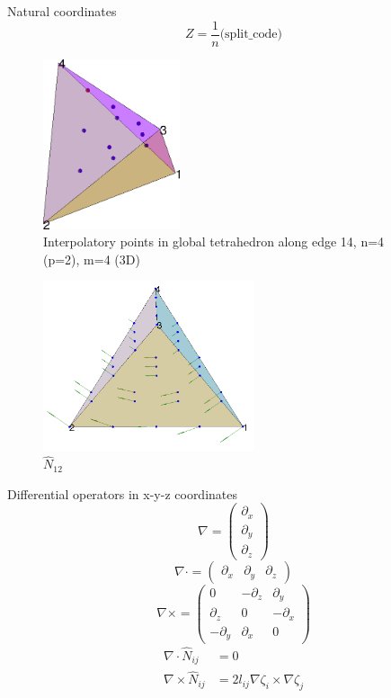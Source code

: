 \documentclass[a4paper,onecolumn]{article}
\begin{document}
Natural coordinates
$$
    Z = \frac{1}{n} \bigl(\textrm{split\_code}\bigr)
$$
\begin{figure}\begin{center}
    \includegraphics[height=5cm]{interppnt3D.png}
    \caption{Interpolatory points in global tetrahedron along edge 14, n=4 (p=2), m=4 (3D)}
\end{center}\end{figure}
\begin{figure}\begin{center}
    \includegraphics[height=5cm]{quiverbasis.png}
    \caption{$\hat{N}_{12}$}
\end{center}\end{figure}
Differential operators in x-y-z coordinates
$$
    \nabla = \begin{pmatrix}\partial_x \\ \partial_y \\\partial_z\end{pmatrix}
$$
$$
    \nabla\cdot = \begin{pmatrix}\partial_x& \partial_y &\partial_z\end{pmatrix}
$$
$$
    \nabla\times = \begin{pmatrix}
        0 & -\partial_z & \partial_y\\
        \partial_z & 0 & -\partial_x\\
        -\partial_y & \partial_x & 0
    \end{pmatrix}
$$
\begin{equation*}\begin{split}
    \nabla\cdot \hat{N}_{ij} &= 0\\
    \nabla\times \hat{N}_{ij}&=2 l_{ij}\nabla\zeta_i\times \nabla\zeta_j
\end{split}\end{equation*}
\end{document}
